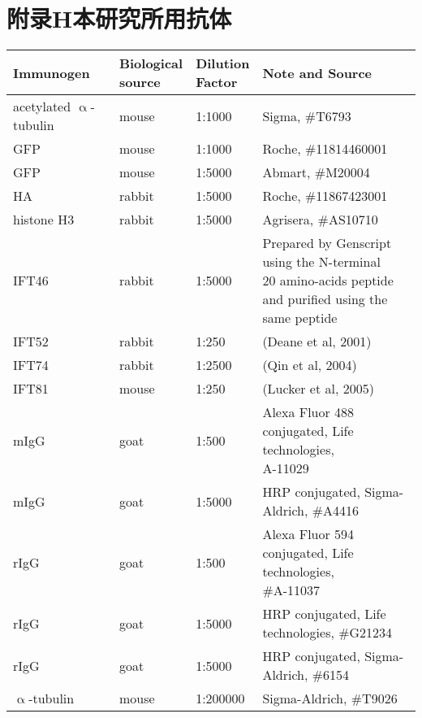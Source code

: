 \chapter{附录H\quad 本研究所用抗体}\label{appen:H}
\renewcommand{\leftmark}{附录H\quad 本研究所用抗体}
\setcounter{chapter}{8}
\setcounter{figure}{0}
\setcounter{table}{0}
\begin{table}[!ht]
\small
\centering
\begin{tabular}[c]{*{4}{l} @{}}
\toprule
\textbf{Immunogen} & \tabincell{l}{\textbf{Biological}\\\textbf{source}} & \tabincell{l}{\textbf{Dilution}\\\textbf{Factor}} & \textbf{Note and Source}\\
\midrule
\tabincell{l}{acetylated\\$\upalpha$-tubulin} & mouse & 1:1000 & Sigma, \#T6793\\
GFP & mouse & 1:1000 & Roche, \#11814460001\\
GFP & mouse & 1:5000 & Abmart, \#M20004\\
HA & rabbit & 1:5000 & Roche, \#11867423001\\
histone H3 & rabbit & 1:5000 & Agrisera, \#AS10710\\
IFT46 & rabbit & 1:5000 & \tabincell{l}{Prepared by Genscript using the N-terminal\\20 amino-acids peptide and purified using the\\same peptide}\\
IFT52 & rabbit & 1:250 & (Deane et al, 2001)\\
IFT74 & rabbit & 1:2500 & (Qin et al, 2004)\\
IFT81 & mouse & 1:250 & (Lucker et al, 2005)\\
mIgG & goat & 1:500 & \tabincell{l}{Alexa Fluor 488 conjugated, Life technologies,\\A-11029}\\
mIgG & goat & 1:5000 & HRP conjugated, Sigma-Aldrich, \#A4416\\
rIgG & goat & 1:500 & \tabincell{l}{Alexa Fluor 594 conjugated, Life technologies,\\\#A-11037}\\
rIgG & goat & 1:5000 & HRP conjugated, Life technologies, \#G21234\\
rIgG & goat & 1:5000 & HRP conjugated, Sigma-Aldrich, \#6154\\
$\upalpha$-tubulin & mouse & 1:200000 & Sigma-Aldrich, \#T9026\\
\bottomrule
\end{tabular}
\end{table}